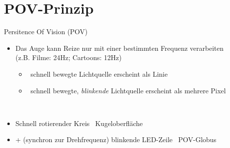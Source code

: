 \section{POV-Prinzip}
\begin{frame}{Persitence Of Vision (POV)}
\begin{exampleblock}{}
\begin{itemize}
\item Das Auge kann Reize nur mit einer bestimmten Frequenz verarbeiten\\
(z.B. Filme: 24Hz; Cartoons: 12Hz)\\
\begin{itemize}
\item[]\Rightarrow\ schnell bewegte Lichtquelle erscheint als Linie
\item[]\Rightarrow\ schnell bewegte, \emph{blinkende} Lichtquelle erscheint als mehrere Pixel
\end{itemize}
\ \\
\item Schnell rotierender Kreis \Rightarrow\ Kugeloberfläche
\item + (synchron zur Drehfrequenz) blinkende LED-Zeile \Rightarrow\ POV-Globus
\end{itemize}
\end{exampleblock}
\end{frame}

